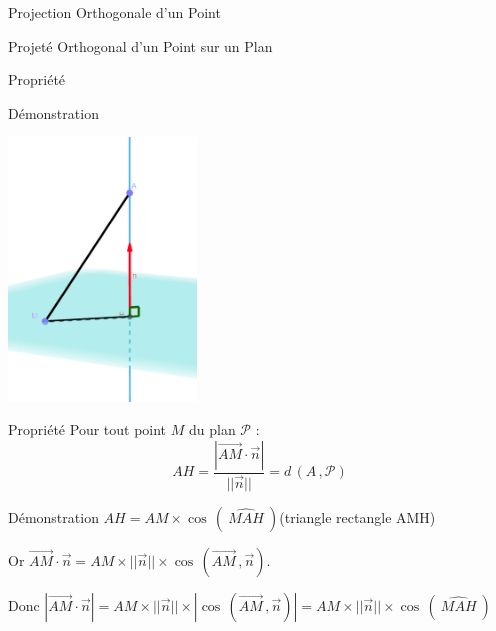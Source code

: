 \documentclass{coursbook}
\begin{document}
\begin{Gpartie}{Projection Orthogonale d'un Point}
\begin{Spartie}{Projeté Orthogonal d'un Point sur un Plan}
\begin{SSSpartie}{Propriété}
\begin{SSSSpartie}{Démonstration}
                    \begin{center}
                        \includegraphics[width=5cm]{rsc/12fig9.png}
                        \parbox{\linewidth}{}
                    \end{center}    
                \end{SSSSpartie}
            \end{SSSpartie}
            \begin{SSSpartie}{Propriété} 
                Pour tout point $M$ du plan $\mathcal{P}$ : \[AH=\frac{\left\lvert\overrightarrow{AM}\cdot\vec{n}\right\rvert}{\lvert\lvert\vec{n}\rvert\rvert}=d\,\left(A\,, \mathcal{P}\right)\]
                \begin{SSSSpartie}{Démonstration} 
                    $AH=AM\times\cos\,\left(~\widehat{MAH}~\right)$\quad (triangle rectangle AMH)

                    Or $\overrightarrow{AM}\cdot\vec{n}=AM\times\lvert\lvert\vec{n}\rvert\rvert\times\cos\,\left(\overrightarrow{AM}\,,\vec{n}\right)$.

                    Donc $\left\lvert\overrightarrow{AM}\cdot\vec{n}\right\rvert=AM\times\lvert\lvert\vec{n}\rvert\rvert\times\left\lvert\cos\,\left(\overrightarrow{AM}\,, \vec{n}\right)\right\rvert=AM\times\lvert\lvert\vec{n}\rvert\rvert\times\cos\,\left(~\widehat{MAH}~\right)$


\end{SSSSpartie}
\end{SSSpartie}
\end{Spartie}
\end{Gpartie}
\end{document}

